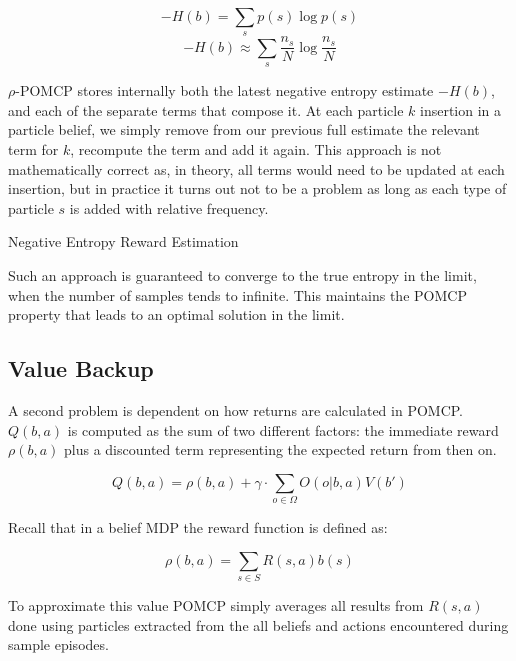 \[ -H(b) = \sum_s p(s) \log p(s) \]
\[ -H(b) \approx \sum_s \frac{n_s}{N} \log \frac{n_s}{N} \]

$\rho$-POMCP stores internally both the latest negative entropy estimate $-H(b)$, and each of the
separate terms that compose it. At each particle $k$ insertion in a particle belief, we simply
remove from our previous full estimate the relevant term for $k$, recompute the term and add it
again. This approach is not mathematically correct as, in theory, all terms would need to be updated
at each insertion, but in practice it turns out not to be a problem as long as each type of particle
$s$ is added with relative frequency.

\begin{algorithm}[H]
    \caption{Negative Entropy Reward Estimation}


\end{algorithm}

Such an approach is guaranteed to converge to the true entropy in the limit, when the number of
samples tends to infinite. This maintains the POMCP property that leads to an optimal solution in
the limit.

\subsection{Value Backup}

A second problem is dependent on how returns are calculated in POMCP. $Q(b,a)$ is computed as the
sum of two different factors: the immediate reward $\rho(b,a)$ plus a discounted term representing
the expected return from then on.

\[ Q(b,a) = \rho(b,a) + \gamma \cdot \sum_{o\in \Omega} O(o|b,a) V(b') \]

Recall that in a belief MDP the reward function is defined as:

\[ \rho(b,a) = \sum_{s\in S} R(s,a) b(s) \]

To approximate this value POMCP simply averages all results from $R(s,a)$ done using particles
extracted from the all beliefs and actions encountered during sample episodes.

